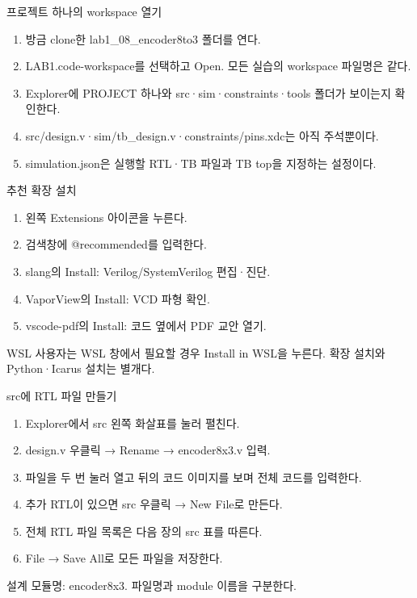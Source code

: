 \begin{frame}{프로젝트 하나의 workspace 열기}\relax
\small
\begin{enumerate}\setlength{\itemsep}{0.22cm}
\item 방금 clone한 lab1\_08\_encoder8to3 폴더를 연다.
\item LAB1.code-workspace를 선택하고 Open. 모든 실습의 workspace 파일명은 같다.
\item Explorer에 PROJECT 하나와 src·sim·constraints·tools 폴더가 보이는지 확인한다.
\item src/design.v·sim/tb\_design.v·constraints/pins.xdc는 아직 주석뿐이다.
\item simulation.json은 실행할 RTL·TB 파일과 TB top을 지정하는 설정이다.
\end{enumerate}

\end{frame}

\begin{frame}{추천 확장 설치}\relax
\small
\begin{enumerate}\setlength{\itemsep}{0.22cm}
\item 왼쪽 Extensions 아이콘을 누른다.
\item 검색창에 @recommended를 입력한다.
\item slang의 Install: Verilog/SystemVerilog 편집·진단.
\item VaporView의 Install: VCD 파형 확인.
\item vscode-pdf의 Install: 코드 옆에서 PDF 교안 열기.
\end{enumerate}
WSL 사용자는 WSL 창에서 필요할 경우 Install in WSL을 누른다. 확장 설치와 Python·Icarus 설치는 별개다.\par
\end{frame}

\begin{frame}{src에 RTL 파일 만들기}\relax
\small
\begin{enumerate}\setlength{\itemsep}{0.22cm}
\item Explorer에서 src 왼쪽 화살표를 눌러 펼친다.
\item design.v 우클릭 → Rename → encoder8x3.v 입력.
\item 파일을 두 번 눌러 열고 뒤의 코드 이미지를 보며 전체 코드를 입력한다.
\item 추가 RTL이 있으면 src 우클릭 → New File로 만든다.
\item 전체 RTL 파일 목록은 다음 장의 src 표를 따른다.
\item File → Save All로 모든 파일을 저장한다.
\end{enumerate}
설계 모듈명: encoder8x3. 파일명과 module 이름을 구분한다.\par
\end{frame}

